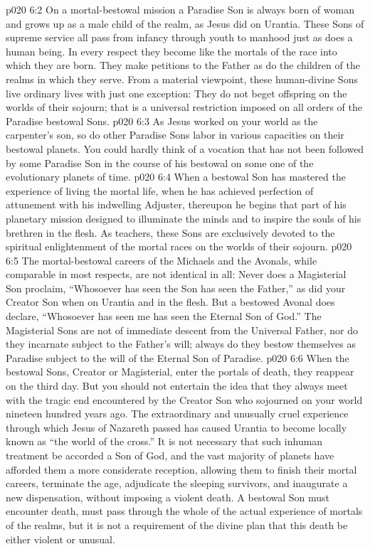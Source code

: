 \pc \vs p020 6:2 On a mortal\hyp{}bestowal mission a Paradise Son is always born of woman and grows up as a male child of the realm, as Jesus did on Urantia. These Sons of supreme service all pass from infancy through youth to manhood just as does a human being. In every respect they become like the mortals of the race into which they are born. They make petitions to the Father as do the children of the realms in which they serve. From a material viewpoint, these human\hyp{}divine Sons live ordinary lives with just one exception: They do not beget offspring on the worlds of their sojourn; that is a universal restriction imposed on all orders of the Paradise bestowal Sons.
\vs p020 6:3 As Jesus worked on your world as the carpenter’s son, so do other Paradise Sons labor in various capacities on their bestowal planets. You could hardly think of a vocation that has not been followed by some Paradise Son in the course of his bestowal on some one of the evolutionary planets of time.
\vs p020 6:4 When a bestowal Son has mastered the experience of living the mortal life, when he has achieved perfection of attunement with his indwelling Adjuster, thereupon he begins that part of his planetary mission designed to illuminate the minds and to inspire the souls of his brethren in the flesh. As teachers, these Sons are exclusively devoted to the spiritual enlightenment of the mortal races on the worlds of their sojourn.
\pc \vs p020 6:5 The mortal\hyp{}bestowal careers of the Michaels and the Avonals, while comparable in most respects, are not identical in all: Never does a Magisterial Son proclaim, \textcolor{ubdarkred}{“Whosoever has seen the Son has seen the Father,”} as did your Creator Son when on Urantia and in the flesh. But a bestowed Avonal does declare, “Whosoever has seen me has seen the Eternal Son of God.” The Magisterial Sons are not of immediate descent from the Universal Father, nor do they incarnate subject to the Father’s will; always do they bestow themselves as Paradise  subject to the will of the Eternal Son of Paradise.
\pc \vs p020 6:6 When the bestowal Sons, Creator or Magisterial, enter the portals of death, they reappear on the third day. But you should not entertain the idea that they always meet with the tragic end encountered by the Creator Son who sojourned on your world nineteen hundred years ago. The extraordinary and unusually cruel experience through which Jesus of Nazareth passed has caused Urantia to become locally known as “the world of the cross.” It is not necessary that such inhuman treatment be accorded a Son of God, and the vast majority of planets have afforded them a more considerate reception, allowing them to finish their mortal careers, terminate the age, adjudicate the sleeping survivors, and inaugurate a new dispensation, without imposing a violent death. A bestowal Son must encounter death, must pass through the whole of the actual experience of mortals of the realms, but it is not a requirement of the divine plan that this death be either violent or unusual.
